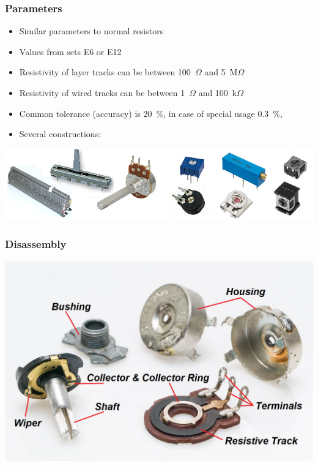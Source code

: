 \documentclass{beamer}
\begin{document}
	\begin{frame}
    \frametitle{Parameters}
		\begin{itemize}
			\item Similar parameters to normal resistors
			\item Values from sets E6 or E12
			\item Resistivity of layer tracks can be between 100~$\Omega$ and 5~M$\Omega$
			\item Resistivity of wired tracks can be between 1~$\Omega$ and 100~k$\Omega$
			\item Common tolerance (accuracy) is 20~$\%$, in case of special usage 0.3~$\%$,
			\item Several constructions:
		\end{itemize}
		\begin{center}
		\includegraphics[scale=0.35]{obr04_konstrukce.png}
		\end{center}
  \end{frame}
	\begin{frame}
    \frametitle{Disassembly}
		\begin{center}
		\includegraphics[scale=0.25]{obr03_rozebrany.png}
		\end{center}

  \end{frame}
\end{document}
